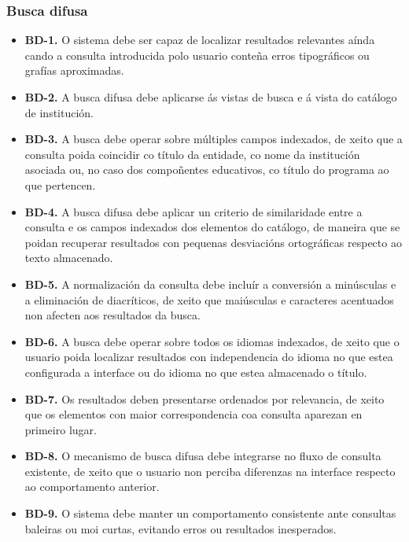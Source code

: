 \documentclass[%
    a4paper,               %
    twoside,               %
    10pt,                  %
]{article}                 %
\begin{document}
\subsubsection{Busca difusa}
\label{req:sec:busca}
\begin{itemize}
    \item \label{req:bd1}\textbf{BD-1.} O sistema debe ser capaz de localizar resultados relevantes aínda cando a consulta introducida polo usuario conteña erros tipográficos ou grafías aproximadas.

    \item \label{req:bd2}\textbf{BD-2.} A busca difusa debe aplicarse ás vistas de busca e á vista do catálogo de institución.

    \item \label{req:bd3}\textbf{BD-3.} A busca debe operar sobre múltiples campos indexados, de xeito que a consulta poida coincidir co título da entidade, co nome da institución asociada ou, no caso dos compoñentes educativos, co título do programa ao que pertencen.

    \item \label{req:bd4}\textbf{BD-4.} A busca difusa debe aplicar un criterio de similaridade entre a consulta e os campos indexados dos elementos do catálogo, de maneira que se poidan recuperar resultados con pequenas desviacións ortográficas respecto ao texto almacenado.

    \item \label{req:bd5}\textbf{BD-5.} A normalización da consulta debe incluír a conversión a minúsculas e a eliminación de diacríticos, de xeito que maiúsculas e caracteres acentuados non afecten aos resultados da busca.

    \item \label{req:bd6}\textbf{BD-6.} A busca debe operar sobre todos os idiomas indexados, de xeito que o usuario poida localizar resultados con independencia do idioma no que estea configurada a interface ou do idioma no que estea almacenado o título.

    \item \label{req:bd7}\textbf{BD-7.} Os resultados deben presentarse ordenados por relevancia, de xeito que os elementos con maior correspondencia coa consulta aparezan en primeiro lugar.

    \item \label{req:bd8}\textbf{BD-8.} O mecanismo de busca difusa debe integrarse no fluxo de consulta existente, de xeito que o usuario non perciba diferenzas na interface respecto ao comportamento anterior.

    \item \label{req:bd9}\textbf{BD-9.} O sistema debe manter un comportamento consistente ante consultas baleiras ou moi curtas, evitando erros ou resultados inesperados.
\end{itemize}
\end{document}
